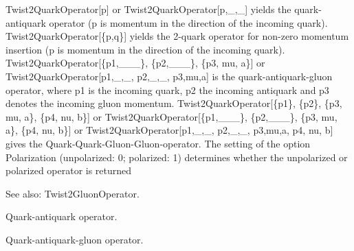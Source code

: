 


Twist2QuarkOperator[p] or Twist2QuarkOperator[p,\_{},\_{}] yields the quark-antiquark operator (p is momentum in the direction of the
  incoming quark). Twist2QuarkOperator[\{p,q\}] yields the 2-quark operator for non-zero momentum insertion (p is momentum in the
  direction of the incoming quark). Twist2QuarkOperator[\{p1,\_{}\_{}\_{}\}, \{p2,\_{}\_{}\_{}\}, \{p3, mu, a\}] or
  Twist2QuarkOperator[p1,\_{},\_{}, p2,\_{},\_{}, p3,mu,a] is the quark-antiquark-gluon operator, where p1 is the incoming quark, p2 the
  incoming antiquark and p3 denotes the incoming gluon momentum. Twist2QuarkOperator[\{p1\}, \{p2\}, \{p3, mu, a\}, \{p4, nu, b\}] or
  Twist2QuarkOperator[\{p1,\_{}\_{}\_{}\}, \{p2,\_{}\_{}\_{}\}, \{p3, mu, a\}, \{p4, nu, b\}] or Twist2QuarkOperator[p1,\_{},\_{},
  p2,\_{},\_{}, p3,mu,a, p4, nu, b] gives the Quark-Quark-Gluon-Gluon-operator. The setting of the option Polarization (unpolarized: 0;
  polarized: 1) determines whether the unpolarized or polarized operator is returned

See also:  Twist2GluonOperator.





Quark-antiquark operator.



Quark-antiquark-gluon operator.

